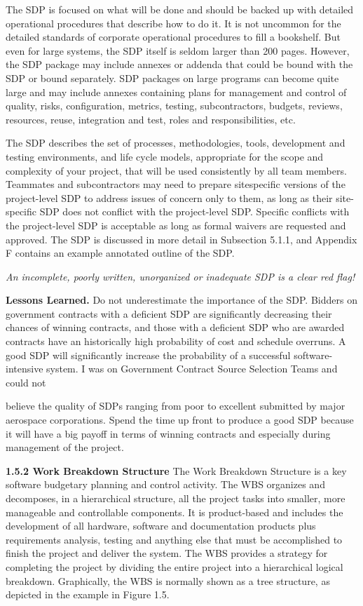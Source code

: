 \documentclass{book}
\begin{document}
\begin{multicols}{2}
The SDP is focused on what will be done and should be
backed up with detailed operational procedures that describe
how to do it. It is not uncommon for the detailed standards
of corporate operational procedures to fill a bookshelf. But
even for large systems, the SDP itself is seldom larger than
200 pages. However, the SDP package may include annexes or
addenda that could be bound with the SDP or bound separately. SDP packages on large programs can become quite
large and may include annexes containing plans for management and control of quality, risks, configuration, metrics,
testing, subcontractors, budgets, reviews, resources, reuse,
integration and test, roles and responsibilities, etc.

The SDP describes the set of processes, methodologies,
tools, development and testing environments, and life cycle
models, appropriate for the scope and complexity of your
project, that will be used consistently by all team members.
Teammates and subcontractors may need to prepare sitespecific versions of the project-level SDP to address issues of
concern only to them, as long as their site-specific SDP does
not conflict with the project-level SDP. Specific conflicts
with the project-level SDP is acceptable as long as formal
waivers are requested and approved. The SDP is discussed in
more detail in Subsection 5.1.1, and Appendix F contains an
example annotated outline of the SDP.

\textit{An incomplete, poorly written, unorganized or
inadequate SDP is a clear red flag!}

\textbf{Lessons Learned.} Do not underestimate the
importance of the SDP. Bidders on government
contracts with a deficient SDP are significantly
decreasing their chances of winning contracts,
and those with a deficient SDP who are awarded
contracts have an historically high probability of
cost and schedule overruns. A good SDP will significantly increase the probability of a successful
software-intensive system. I was on Government
Contract Source Selection Teams and could not 


believe the quality of SDPs ranging from poor to
excellent submitted by major aerospace corporations. Spend the time up front to produce a good
SDP because it will have a big payoff in terms
of winning contracts and especially during management of the project.

\textbf{1.5.2 Work Breakdown Structure}
The Work Breakdown Structure is a key software budgetary planning and control activity. The WBS organizes and
decomposes, in a hierarchical structure, all the project tasks
into smaller, more manageable and controllable components. It is product-based and includes the development of
all hardware, software and documentation products plus
requirements analysis, testing and anything else that must
be accomplished to finish the project and deliver the system.
The WBS provides a strategy for completing the project by
dividing the entire project into a hierarchical logical breakdown. Graphically, the WBS is normally shown as a tree
structure, as depicted in the example in Figure 1.5.


\end{multicols}
\end{document}
